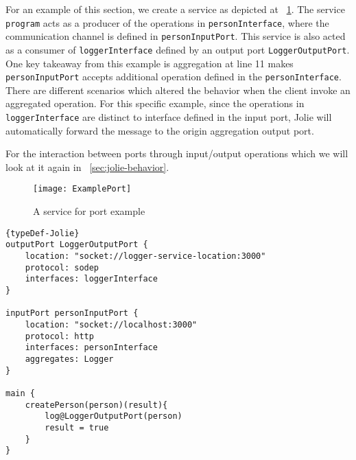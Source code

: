 \FloatBarrier

For an example of this section, we create a service as depicted at ~\ref{listing:example-port-graphic}.
The service \texttt{program} acts as a producer of the operations in \texttt{personInterface}, where the communication channel is defined in \texttt{personInputPort}.
This service is also acted as a consumer of \texttt{loggerInterface} defined by an output port \texttt{LoggerOutputPort}.
One key takeaway from this example is aggregation at line 11 makes \texttt{personInputPort} accepts additional operation defined in the \texttt{personInterface}. There are different scenarios which altered the behavior when the client invoke an aggregated operation. For this specific example, since the operations in \texttt{loggerInterface} are distinct to interface defined in the input port, Jolie will automatically forward the message to the origin aggregation output port.

For the interaction between ports through input/output operations which we will look at it again in ~\ref{sec:jolie-behavior}.

\begin{figure}[ht]
    \texttt{[image: ExamplePort]}
    \centering
    \caption{A service for port example}
    \label{listing:example-port-graphic}
\end{figure}

\begin{listing}[ht]

    \lstset{language=Jolie,
        style=codeStyle,
        numbers=left,
        firstnumber=1
    }
    \begin{lstlisting}[frame=tlrb]{typeDef-Jolie}
outputPort LoggerOutputPort {
    location: "socket://logger-service-location:3000"
    protocol: sodep
    interfaces: loggerInterface
}

inputPort personInputPort {
    location: "socket://localhost:3000"
    protocol: http
    interfaces: personInterface
    aggregates: Logger
}

main {
    createPerson(person)(result){
        log@LoggerOutputPort(person)
        result = true
    }
}
\end{lstlisting}
    \caption{Jolie Port declaration example}
    \label{listing:example-port}
\end{listing}

\FloatBarrier
